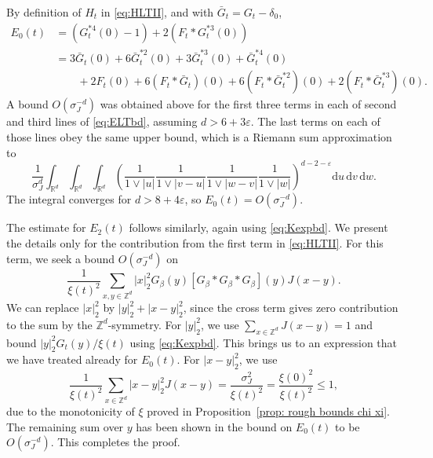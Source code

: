 \documentclass[11pt,a4paper]{article}
\numberwithin{equation}{section}
\theoremstyle{plain}
\theoremstyle{definition}
\newcommand\1{\mathds{1}}
\begin{document}
By definition of $H_t$ in \eqref{eq:HLTII}, and with $\bar G_t = G_t -\delta_0$,
\begin{align}
    E_0(t) &= (G_t^{*4}(0)-1) + 2(F_t*G_t^{*3}(0))
    \nonumber \\ & =
    3\bar G_t(0) + 6 \bar G_t^{*2}(0) + 3\bar G_t^{*3}(0) + \bar G_t^{*4}(0)
    \nonumber \\ & \qquad
     +2F_t(0) +6(F_t*\bar G_t)(0) + 6 (F_t * \bar G_t^{*2})(0) + 2(F_t * \bar G_t^{*3})(0).
\label{eq:ELTbd}
\end{align}
A bound $O(\sigma_J^{-d})$ was obtained above for the first three
terms in each of second and third lines of \eqref{eq:ELTbd},
assuming $d>6+3\varepsilon$.  The last terms on each of those lines
obey the same upper bound,
which is a Riemann sum approximation to
\begin{equation}
    \frac{1}{\sigma_J^d}
    \int_{\mathbb R^d}  \int_{\mathbb R^d}  \int_{\mathbb R^d}
    \left(
    \frac{1}{1\vee |u|} \frac{1}{1\vee |v-u|}\frac{1}{1\vee |w-v|}\frac{1}{1\vee |w|}
    \right)^{d-2-\varepsilon}
    \mathrm{d}u\, \mathrm{d}v\, \mathrm{d}w.
\end{equation}
The integral converges for $d>8+4\varepsilon$, so $E_0(t)=O(\sigma_J^{-d})$.

The estimate for $E_2(t)$ follows similarly, again using \eqref{eq:Kexpbd}.  We present the details only for the contribution from the first term in \eqref{eq:HLTII}.  For this term, we seek a bound $O(\sigma_J^{-d})$ on
\begin{equation}
    \frac{1}{\xi(t)^2}
    \sum_{x,y\in \mathbb Z^d}
    |x|_2^2 G_{\beta}(y) [G_{\beta}*G_{\beta}*G_{\beta}](y) J(x-y).
\end{equation}
We can replace $|x|_2^2$ by $|y|_2^2 + |x-y|_2^2$, since the cross term gives zero contribution to the sum by the $\mathbb Z^d$-symmetry.
For $|y|_2^2$, we use $\sum_{x\in \mathbb Z^d}J(x-y)=1$ and bound  $|y|_2^2G_t(y)/\xi(t)$ using \eqref{eq:Kexpbd}.  This brings us to
an expression that we have treated already for $E_0(t)$.
For $|x-y|_2^2$, we use
\begin{equation}
    \frac{1}{\xi(t)^2} \sum_{x\in \mathbb Z^d} |x-y|_2^2 J(x-y)
    = \frac{\sigma_J^2}{\xi(t)^2} = \frac{\xi(0)^2}{\xi(t)^2} \le 1
    ,
\end{equation}
due to the monotonicity of $\xi$ proved in Proposition~\ref{prop: rough bounds chi xi}.  The remaining sum over $y$ has been shown in the bound on $E_0(t)$ to be $O(\sigma_J^{-d})$.  This completes the proof.
\end{document}
